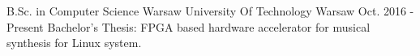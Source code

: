 

\begin{cventries}

  \cventry
    {B.Sc. in Computer Science} %
    {Warsaw University Of Technology} %
    {Warsaw} %
    {Oct. 2016 - Present} %
    {Bachelor's Thesis: FPGA based hardware accelerator for musical synthesis for Linux system.}

\end{cventries}
